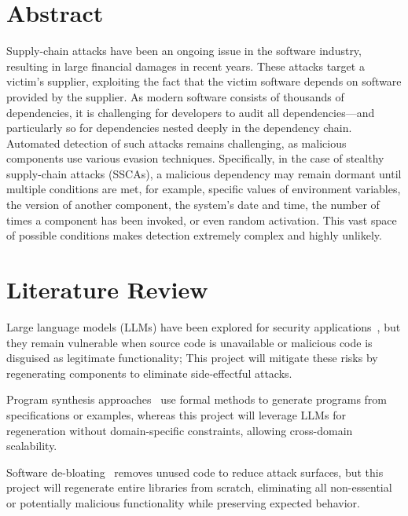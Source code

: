 \documentclass[a4paper,twoside,11pt]{report} %
\begin{document}

\pagecolor{white}
\pagestyle{empty}
\pagestyle{main}

\section*{Abstract}
Supply-chain attacks have been an ongoing issue in the software industry,
resulting in large financial damages in recent years. These attacks target a
victim’s supplier, exploiting the fact that the victim software depends on
software provided by the supplier. As modern software consists of thousands of
dependencies, it is challenging for developers to audit all dependencies—and
particularly so for dependencies nested deeply in the dependency chain.
Automated detection of such attacks remains challenging, as malicious
components use various evasion techniques. Specifically, in the case of
stealthy supply-chain attacks (SSCAs), a malicious dependency may remain
dormant until multiple conditions are met, for example, specific values of
environment variables, the version of another component, the system’s date and
time, the number of times a component has been invoked, or even random
activation. This vast space of possible conditions makes detection extremely
complex and highly unlikely.

\section*{Literature Review}
Large language models (LLMs) have been explored for security
applications~\cite{alkaraki2024exploringllmsmalwaredetection, llmvulndetection2023}, 
but they remain vulnerable when source code is
unavailable or malicious code is disguised as legitimate functionality; This project
will mitigate these risks by regenerating components to eliminate side-effectful
attacks.

Program synthesis approaches~\cite{harp:ccs:2021, feser2015synthesizing,
gulwani2011automating} use formal methods to generate programs from
specifications or examples, whereas this project will leverage LLMs for regeneration
without domain-specific constraints, allowing cross-domain scalability.

Software de-bloating~\cite{brown2024broad, babak2019less, kalhauge:2019:binary-reduction} removes unused code
to reduce attack surfaces, but this project will regenerate entire libraries from scratch,
eliminating all non-essential or potentially malicious functionality while
preserving expected behavior.
\end{document}
